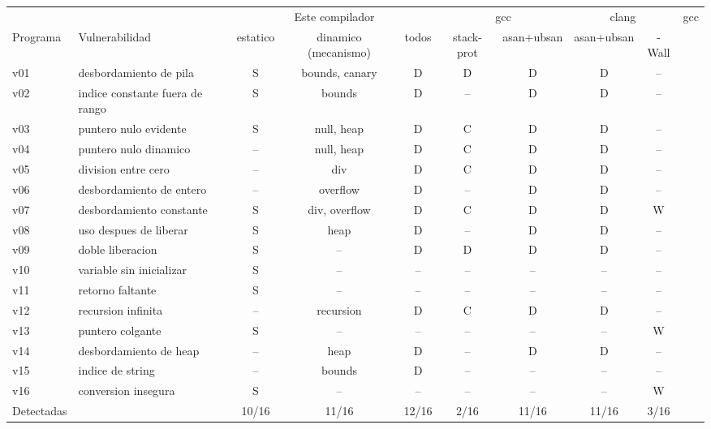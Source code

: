 \begin{tabular}{llcccccccc}\toprule
 & & \multicolumn{3}{c}{Este compilador} & \multicolumn{2}{c}{gcc} & \multicolumn{2}{c}{clang} & gcc \\
\cmidrule(lr){3-5}\cmidrule(lr){6-7}\cmidrule(lr){8-9}
Programa & Vulnerabilidad & estatico & dinamico (mecanismo) & todos & stack-prot & asan+ubsan & asan+ubsan & -Wall \\\midrule
v01 & desbordamiento de pila & S & bounds, canary & D & D & D & D & -- \\
v02 & indice constante fuera de rango & S & bounds & D & -- & D & D & -- \\
v03 & puntero nulo evidente & S & null, heap & D & C & D & D & -- \\
v04 & puntero nulo dinamico & -- & null, heap & D & C & D & D & -- \\
v05 & division entre cero & -- & div & D & C & D & D & -- \\
v06 & desbordamiento de entero & -- & overflow & D & -- & D & D & -- \\
v07 & desbordamiento constante & S & div, overflow & D & C & D & D & W \\
v08 & uso despues de liberar & S & heap & D & -- & D & D & -- \\
v09 & doble liberacion & S & -- & D & D & D & D & -- \\
v10 & variable sin inicializar & S & -- & -- & -- & -- & -- & -- \\
v11 & retorno faltante & S & -- & -- & -- & -- & -- & -- \\
v12 & recursion infinita & -- & recursion & D & C & D & D & -- \\
v13 & puntero colgante & S & -- & -- & -- & -- & -- & W \\
v14 & desbordamiento de heap & -- & heap & D & -- & D & D & -- \\
v15 & indice de string & -- & bounds & D & -- & -- & -- & -- \\
v16 & conversion insegura & S & -- & -- & -- & -- & -- & W \\
\midrule
Detectadas & & 10/16 & 11/16 & 12/16 & 2/16 & 11/16 & 11/16 & 3/16 \\
\bottomrule\end{tabular}
